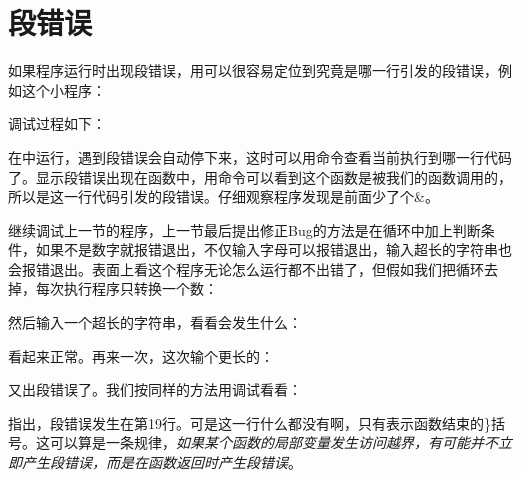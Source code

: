 
\section{段错误}
%
如果程序运行时出现段错误，用可以很容易定位到究竟是哪一行引发的段错误，例如这个小程序：





调试过程如下：




在中运行，遇到段错误会自动停下来，这时可以用命令查看当前执行到哪一行代码了。显示段错误出现在函数中，用命令可以看到这个函数是被我们的函数调用的，所以是这一行代码引发的段错误。仔细观察程序发现是前面少了个\&。



继续调试上一节的程序，上一节最后提出修正Bug的方法是在循环中加上判断条件，如果不是数字就报错退出，不仅输入字母可以报错退出，输入超长的字符串也会报错退出。表面上看这个程序无论怎么运行都不出错了，但假如我们把循环去掉，每次执行程序只转换一个数：





然后输入一个超长的字符串，看看会发生什么：




看起来正常。再来一次，这次输个更长的：




又出段错误了。我们按同样的方法用调试看看：




指出，段错误发生在第19行。可是这一行什么都没有啊，只有表示函数结束的\}括号。这可以算是一条规律，\emph{如果某个函数的局部变量发生访问越界，有可能并不立即产生段错误，而是在函数返回时产生段错误}。



